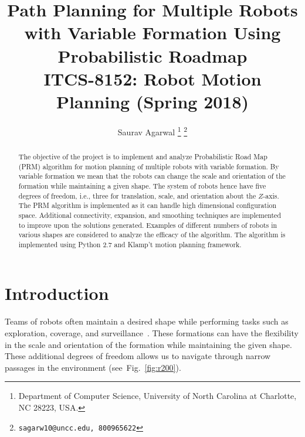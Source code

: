 \documentclass[12pt,a4paper, onecolumn]{IEEEtran}
\author{Saurav Agarwal
  \thanks{Department of Computer Science, University of North
  Carolina at Charlotte, NC 28223, USA.}%
  \thanks{{\tt \small sagarw10@uncc.edu, 800965622}} %

}
\newcommand{\fgref}[1]{Fig.~\ref{#1}}
\begin{document}
\title{{\Large \bf Path Planning for Multiple Robots with Variable Formation Using
Probabilistic Roadmap}\\{\large ITCS-8152: Robot Motion Planning} {\large (Spring 2018)} }
\maketitle
%
\begin{abstract}
%
  The objective of the project is to implement and analyze Probabilistic Road Map (PRM) algorithm for motion planning of multiple robots with variable formation. By variable formation we mean that the robots can change the scale and orientation of the formation while maintaining a given shape. The system of robots hence have five degrees of freedom, i.e., three for translation, scale, and orientation about the $Z$-axis. The PRM algorithm is implemented as it can handle high dimensional configuration space. Additional connectivity, expansion, and smoothing techniques are implemented to improve upon the solutions generated. Examples of different numbers of robots in various shapes are considered to analyze the efficacy of the algorithm. The algorithm is implemented using Python 2.7 and Klamp't motion planning framework.
\end{abstract}

\section{Introduction}
%
Teams of robots often maintain a desired shape while performing tasks such as exploration,
coverage, and surveillance~\cite{TurpinMK12ICRA}. These formations can have the
flexibility in the scale and orientation of the formation while maintaining the given
shape. These additional degrees of freedom allows us to navigate through narrow passages
in the environment (see~\fgref{fig:r200}).
\end{document}
